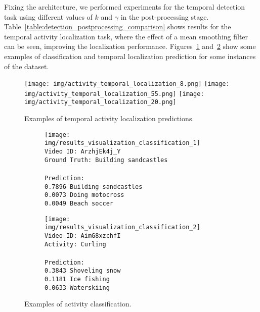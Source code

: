 \documentclass{article}
\begin{document}
Fixing the architecture, we performed experiments for the temporal detection task using different values of $k$ and $\gamma$ in the post-processing stage.
Table~\ref{table:detection_postprocessing_comparison} shows results for the temporal activity localization task, where the effect of a mean smoothing filter can be seen, improving the localization performance.
Figures~\ref{fig:example_results_detect} and~\ref{fig:example_results_classification} show some examples of classification and temporal localization prediction for some instances of the dataset.
\begin{figure}[ht]
\centering
\texttt{[image: img/activity\_temporal\_localization\_8.png]}
\texttt{[image: img/activity\_temporal\_localization\_55.png]}
\texttt{[image: img/activity\_temporal\_localization\_20.png]}
\caption{Examples of temporal activity localization predictions.}
\label{fig:example_results_detect}
\end{figure}

\begin{figure}[h]
\centering
\begin{subfigure}[b]{.5\textwidth}
    \texttt{[image: img/results\_visualization\_classification\_1]}
    \texttt{Video ID: ArzhjEk4j\_Y \\
    Ground Truth: Building sandcastles \\
    \\
    Prediction: \\
    0.7896	Building sandcastles \\
    0.0073	Doing motocross \\
    0.0049	Beach soccer \\}
\end{subfigure}%
\begin{subfigure}[b]{.5\textwidth}
    \texttt{[image: img/results\_visualization\_classification\_2]}
    \texttt{Video ID: AimG8xzchfI \\
	Activity: Curling \\
    \\
    Prediction: \\
    0.3843	Shoveling snow \\
    0.1181	Ice fishing \\
    0.0633	Waterskiing \\}
\end{subfigure}

\caption{Examples of activity classification.}
\label{fig:example_results_classification}
\end{figure}
\end{document}
